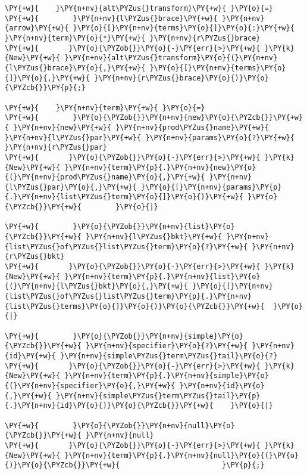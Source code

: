 \begin{Verbatim}[commandchars=\\\{\}]
\PY{+w}{    }\PY{n+nv}{alt\PYZus{}transform}\PY{+w}{ }\PY{o}{=}
\PY{+w}{        }\PY{n+nv}{l\PYZus{}brace}\PY{+w}{ }\PY{n+nv}{arrow}\PY{+w}{ }\PY{o}{[}\PY{n+nv}{terms}\PY{o}{]}\PY{o}{:}\PY{+w}{ }\PY{n+nv}{term}\PY{o}{*}\PY{+w}{ }\PY{n+nv}{r\PYZus{}brace}
\PY{+w}{	   }\PY{o}{\PYZob{}}\PY{o}{-}\PY{err}{>}\PY{+w}{ }\PY{k}{New}\PY{+w}{ }\PY{n+nv}{alt\PYZus{}transform}\PY{o}{(}\PY{n+nv}{l\PYZus{}brace}\PY{o}{,}\PY{+w}{ }\PY{o}{[}\PY{n+nv}{terms}\PY{o}{]}\PY{o}{,}\PY{+w}{ }\PY{n+nv}{r\PYZus{}brace}\PY{o}{)}\PY{o}{\PYZcb{}}\PY{p}{;}

\PY{+w}{    }\PY{n+nv}{term}\PY{+w}{ }\PY{o}{=}
\PY{+w}{        }\PY{o}{\PYZob{}}\PY{n+nv}{new}\PY{o}{\PYZcb{}}\PY{+w}{ }\PY{n+nv}{new}\PY{+w}{ }\PY{n+nv}{prod\PYZus{}name}\PY{+w}{ }\PY{n+nv}{l\PYZus{}par}\PY{+w}{ }\PY{n+nv}{params}\PY{o}{?}\PY{+w}{ }\PY{n+nv}{r\PYZus{}par}
\PY{+w}{	   }\PY{o}{\PYZob{}}\PY{o}{-}\PY{err}{>}\PY{+w}{ }\PY{k}{New}\PY{+w}{ }\PY{n+nv}{term}\PY{p}{.}\PY{n+nv}{new}\PY{o}{(}\PY{n+nv}{prod\PYZus{}name}\PY{o}{,}\PY{+w}{ }\PY{n+nv}{l\PYZus{}par}\PY{o}{,}\PY{+w}{ }\PY{o}{[}\PY{n+nv}{params}\PY{p}{.}\PY{n+nv}{list\PYZus{}term}\PY{o}{]}\PY{o}{)}\PY{+w}{ }\PY{o}{\PYZcb{}}\PY{+w}{ 		}\PY{o}{|}

\PY{+w}{        }\PY{o}{\PYZob{}}\PY{n+nv}{list}\PY{o}{\PYZcb{}}\PY{+w}{ }\PY{n+nv}{l\PYZus{}bkt}\PY{+w}{ }\PY{n+nv}{list\PYZus{}of\PYZus{}list\PYZus{}term}\PY{o}{?}\PY{+w}{ }\PY{n+nv}{r\PYZus{}bkt}
\PY{+w}{	   }\PY{o}{\PYZob{}}\PY{o}{-}\PY{err}{>}\PY{+w}{ }\PY{k}{New}\PY{+w}{ }\PY{n+nv}{term}\PY{p}{.}\PY{n+nv}{list}\PY{o}{(}\PY{n+nv}{l\PYZus{}bkt}\PY{o}{,}\PY{+w}{ }\PY{o}{[}\PY{n+nv}{list\PYZus{}of\PYZus{}list\PYZus{}term}\PY{p}{.}\PY{n+nv}{list\PYZus{}terms}\PY{o}{]}\PY{o}{)}\PY{o}{\PYZcb{}}\PY{+w}{ 	}\PY{o}{|}

\PY{+w}{        }\PY{o}{\PYZob{}}\PY{n+nv}{simple}\PY{o}{\PYZcb{}}\PY{+w}{ }\PY{n+nv}{specifier}\PY{o}{?}\PY{+w}{ }\PY{n+nv}{id}\PY{+w}{ }\PY{n+nv}{simple\PYZus{}term\PYZus{}tail}\PY{o}{?}
\PY{+w}{	   }\PY{o}{\PYZob{}}\PY{o}{-}\PY{err}{>}\PY{+w}{ }\PY{k}{New}\PY{+w}{ }\PY{n+nv}{term}\PY{p}{.}\PY{n+nv}{simple}\PY{o}{(}\PY{n+nv}{specifier}\PY{o}{,}\PY{+w}{ }\PY{n+nv}{id}\PY{o}{,}\PY{+w}{ }\PY{n+nv}{simple\PYZus{}term\PYZus{}tail}\PY{p}{.}\PY{n+nv}{id}\PY{o}{)}\PY{o}{\PYZcb{}}\PY{+w}{ 	}\PY{o}{|}

\PY{+w}{        }\PY{o}{\PYZob{}}\PY{n+nv}{null}\PY{o}{\PYZcb{}}\PY{+w}{ }\PY{n+nv}{null}
\PY{+w}{	   }\PY{o}{\PYZob{}}\PY{o}{-}\PY{err}{>}\PY{+w}{ }\PY{k}{New}\PY{+w}{ }\PY{n+nv}{term}\PY{p}{.}\PY{n+nv}{null}\PY{o}{(}\PY{o}{)}\PY{o}{\PYZcb{}}\PY{+w}{						}\PY{p}{;}


\end{Verbatim}
